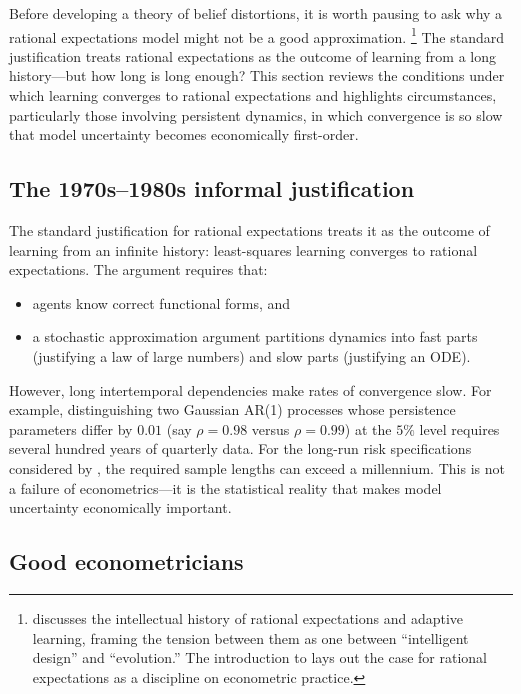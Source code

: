 \documentclass[12pt]{article}
\theoremstyle{definition}
\begin{document}
Before developing a theory of belief distortions, it is worth pausing to
ask why a rational expectations model might not be a good approximation.%
\footnote{\citet{Sargent2008} discusses the intellectual history of rational
expectations and adaptive learning, framing the tension between them as
one between ``intelligent design'' and ``evolution.''  The introduction
to \citet{LucasSargent1981} lays out the case for rational expectations
as a discipline on econometric practice.}
The standard justification treats rational expectations as the outcome
of learning from a long history---but how long is long enough?  This
section reviews the conditions under which learning converges to
rational expectations and highlights circumstances, particularly those
involving persistent dynamics, in which convergence is so slow that
model uncertainty becomes economically first-order.

\subsection{The 1970s--1980s informal justification}

The standard justification for rational expectations treats it as the
outcome of learning from an infinite history: least-squares learning
converges to rational expectations.  The argument requires that:
\begin{itemize}
\item agents know correct functional forms, and
\item a stochastic approximation argument partitions dynamics into fast
      parts (justifying a law of large numbers) and slow parts
      (justifying an ODE).
\end{itemize}
However, long intertemporal dependencies make
{\color{red} rates of convergence slow}.
For example, distinguishing two Gaussian AR(1) processes whose
persistence parameters differ by $0.01$ (say $\rho = 0.98$ versus
$\rho = 0.99$) at the $5\%$ level requires several hundred years of
quarterly data.  For the long-run risk specifications considered by
\citet{BY2004}, the required sample lengths can exceed a
millennium.  This is not a failure of econometrics---it is the
statistical reality that makes model uncertainty economically important.

\subsection{Good econometricians}
\end{document}
